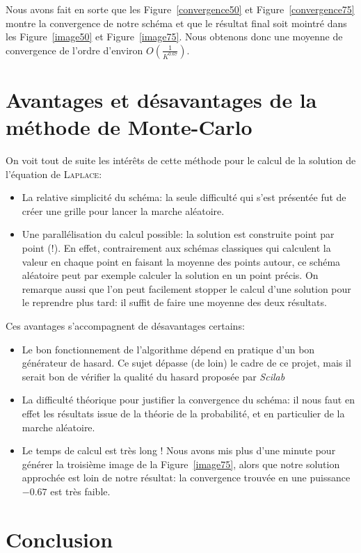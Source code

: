\documentclass[12pt, a4paper]{article}
\begin{document}
Nous avons fait en sorte que les Figure~\ref{convergence50} et Figure~\ref{convergence75} montre la
convergence de notre schéma et que le résultat final soit mointré dans les Figure~\ref{image50} et
Figure~\ref{image75}.
Nous obtenons donc une moyenne de convergence de l'ordre d'environ $O(\frac{1}{K^{0.67}})$.
\section{Avantages et désavantages de la méthode de Monte-Carlo}

On voit tout de suite les intérêts de cette méthode pour le calcul de la solution de l'équation de
\textsc{Laplace}:
\begin{itemize}
	\item La relative simplicité du schéma: la seule difficulté qui s'est présentée fut de créer
		une grille pour lancer la marche aléatoire.
	\item Une parallélisation du calcul possible: la solution est construite point par point
		(!). En effet, contrairement aux schémas classiques qui calculent la valeur en
		chaque point en faisant la moyenne des points autour, ce schéma aléatoire peut par
		exemple calculer la solution en un point précis. On remarque aussi que l'on peut
		facilement stopper le calcul d'une solution pour le reprendre plus tard: il suffit
		de faire une moyenne des deux résultats.
\end{itemize}

Ces avantages s'accompagnent de désavantages certains:
\begin{itemize}
	\item Le bon fonctionnement de l'algorithme dépend en pratique d'un bon générateur de
		hasard. Ce sujet dépasse (de loin) le cadre de ce projet, mais il serait bon de
		vérifier la qualité du hasard proposée par \emph{Scilab}
	\item La difficulté théorique pour justifier la convergence du schéma: il nous faut en effet
		les résultats issue de la théorie de la probabilité, et en particulier de la marche
		aléatoire.
    \item Le temps de calcul est très long ! Nous avons mis plus d'une minute pour générer la
        troisième image de la Figure~\ref{image75}, alors que notre solution approchée est loin de
        notre résultat: la convergence trouvée en une puissance $-0.67$ est très faible.
\end{itemize}

\section{Conclusion}
\end{document}
